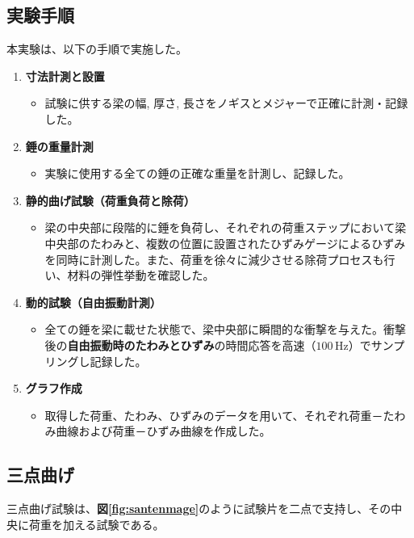 \documentclass[a4j]{jarticle}
\begin{document}
\subsection{実験手順}

本実験は、以下の手順で実施した。

\begin{enumerate}
    \item \textbf{寸法計測と設置}
    \begin{itemize}
        \item 試験に供する梁の幅, 厚さ, 長さをノギスとメジャーで正確に計測・記録した。
    \end{itemize}

    \item \textbf{錘の重量計測}
    \begin{itemize}
        \item 実験に使用する全ての錘の正確な重量を計測し、記録した。
    \end{itemize}

    \item \textbf{静的曲げ試験（荷重負荷と除荷）}
    \begin{itemize}
        \item 梁の中央部に段階的に錘を負荷し、それぞれの荷重ステップにおいて梁中央部のたわみと、複数の位置に設置されたひずみゲージによるひずみを同時に計測した。また、荷重を徐々に減少させる除荷プロセスも行い、材料の弾性挙動を確認した。
    \end{itemize}
    
    \item \textbf{動的試験（自由振動計測）}
    \begin{itemize}
        \item 全ての錘を梁に載せた状態で、梁中央部に瞬間的な衝撃を与えた。衝撃後の\textbf{自由振動時のたわみとひずみ}の時間応答を高速（$100\,\mathrm{Hz}$）でサンプリングし記録した。
    \end{itemize}

    \item \textbf{グラフ作成}
    \begin{itemize}
        \item 取得した荷重、たわみ、ひずみのデータを用いて、それぞれ荷重－たわみ曲線および荷重－ひずみ曲線を作成した。
    \end{itemize}
\end{enumerate}

\subsection{三点曲げ}
三点曲げ試験は、\textbf{図\ref{fig:santenmage}}のように試験片を二点で支持し、その中央に荷重を加える試験である。
\end{document}
